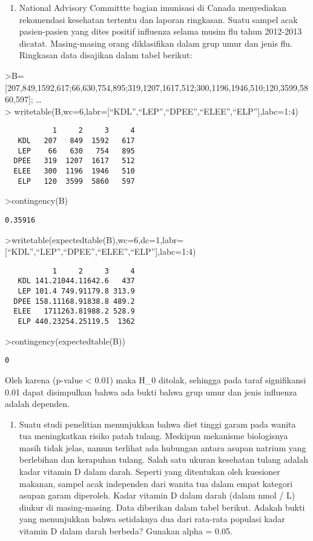\documentclass[
]{book}
\providecommand{\tightlist}{%
  \setlength{\itemsep}{0pt}\setlength{\parskip}{0pt}}
\begin{document}
\begin{enumerate}
\def\labelenumi{\arabic{enumi}.}
\tightlist
\item
  National Advisory Committte bagian imunisasi di Canada menyediakan rekomendasi kesehatan tertentu dan laporan ringkasan. Suatu sampel acak pasien-pasien yang dites positif influenza selama musim flu tahun 2012-2013 dicatat. Masing-masing orang diklasifikan dalam grup umur dan jenis flu. Ringkasan data disajikan dalam tabel berikut:
\end{enumerate}

\textgreater B={[}207,849,1592,617;66,630,754,895;319,1207,1617,512;300,1196,1946,510;120,3599,5860,597{]}; \ldots{}\\
\textgreater{} writetable(B,wc=6,labr={[}``KDL'',``LEP'',``DPEE'',``ELEE'',``ELP''{]},labc=1:4)

\begin{verbatim}
           1     2     3     4
   KDL   207   849  1592   617
   LEP    66   630   754   895
  DPEE   319  1207  1617   512
  ELEE   300  1196  1946   510
   ELP   120  3599  5860   597
\end{verbatim}

\textgreater contingency(B)

\begin{verbatim}
0.35916
\end{verbatim}

\textgreater writetable(expectedtable(B),wc=6,dc=1,labr={[}``KDL'',``LEP'',``DPEE'',``ELEE'',``ELP''{]},labc=1:4)

\begin{verbatim}
           1     2     3     4
   KDL 141.21044.11642.6   437
   LEP 101.4 749.91179.8 313.9
  DPEE 158.11168.91838.8 489.2
  ELEE   1711263.81988.2 528.9
   ELP 440.23254.25119.5  1362
\end{verbatim}

\textgreater contingency(expectedtable(B))

\begin{verbatim}
0
\end{verbatim}

Oleh karena (p-value \textless{} 0.01) maka H\_0 ditolak, sehingga pada taraf signifikansi 0.01 dapat disimpulkan bahwa ada bukti bahwa grup umur dan jenis influenza adalah dependen.

\begin{enumerate}
\def\labelenumi{\arabic{enumi}.}
\setcounter{enumi}{1}
\tightlist
\item
  Suatu studi penelitian menunjukkan bahwa diet tinggi garam pada wanita tua meningkatkan risiko patah tulang. Meskipun mekanisme biologisnya masih tidak jelas, namun terlihat ada hubungan antara asupan natrium yang berlebihan dan kerapuhan tulang. Salah satu ukuran kesehatan tulang adalah kadar vitamin D dalam darah. Seperti yang ditentukan oleh kuesioner makanan, sampel acak independen dari wanita tua dalam empat kategori asupan garam diperoleh. Kadar vitamin D dalam darah (dalam nmol / L) diukur di masing-masing. Data diberikan dalam tabel berikut. Adakah bukti yang menunjukkan bahwa setidaknya dua dari rata-rata populasi kadar vitamin D dalam darah berbeda? Gunakan alpha = 0.05.
\end{enumerate}
\end{document}
